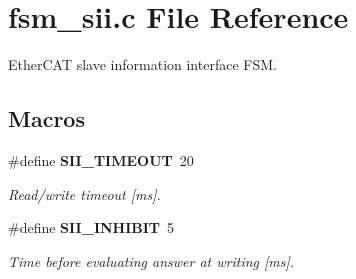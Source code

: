 \section{fsm\-\_\-sii.\-c File Reference}
\label{fsm__sii_8c}


Ether\-C\-A\-T slave information interface F\-S\-M.  


\subsection*{Macros}
\begin{DoxyCompactItemize}
\item 
\#define {\bf S\-I\-I\-\_\-\-T\-I\-M\-E\-O\-U\-T}~20
\begin{DoxyCompactList}\small\item\em Read/write timeout [ms]. \end{DoxyCompactList}\item 
\#define {\bf S\-I\-I\-\_\-\-I\-N\-H\-I\-B\-I\-T}~5\label{fsm__sii_8c_aaf562911fbe9d8d473390f97c2a185e1}

\begin{DoxyCompactList}\small\item\em Time before evaluating answer at writing [ms]. \end{DoxyCompactList}\end{DoxyCompactItemize}
